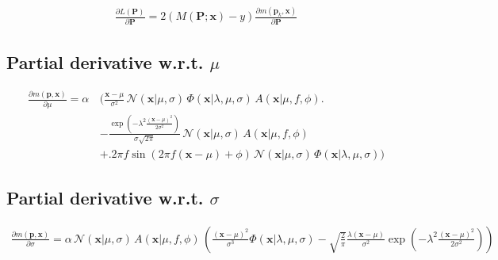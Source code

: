 \documentclass{article}
\begin{document}
\begin{align}
\frac{\partial L\left(\mathbf{P}\right)}{\partial \mathbf{P}}=2\left(M\left(\mathbf{P};\mathbf{x}\right)-y\right)\frac{\partial m\left(\mathbf{p}_k,\mathbf{x}\right)}{\partial \mathbf{P}}
\label{eq:partial_mu}
\end{align}

\subsection{Partial derivative w.r.t. $\mu$}

\begin{align}
\frac{\partial m\left(\mathbf{p},\mathbf{x}\right)}{\partial \mu} = \alpha \, 
&\Bigg(\frac{\mathbf{x}-\mu}{\sigma^2} \, \mathcal{N}(\mathbf{x}|\mu,\sigma) \, \Phi(\mathbf{x}|\lambda,\mu,\sigma) \, A(\mathbf{x}|\mu,f,\phi) \Bigg. \\
&-\frac{\exp\left(-\lambda^2\frac{(\mathbf{x}-\mu)^2}{2\sigma^2}\right)}{\sigma\sqrt{2\pi}} \, \mathcal{N}(\mathbf{x}|\mu,\sigma) \, A(\mathbf{x}|\mu,f,\phi) \\
&+\Bigg. 2\pi f \sin(2\pi f(\mathbf{x}-\mu)+\phi) \, \mathcal{N}(\mathbf{x}|\mu,\sigma) \, \Phi(\mathbf{x}|\lambda,\mu,\sigma)
\Bigg)
\end{align}

\subsection{Partial derivative w.r.t. $\sigma$}

\begin{align}
\frac{\partial m\left(\mathbf{p},\mathbf{x}\right)}{\partial \sigma} =
\alpha \, \mathcal{N}(\mathbf{x}|\mu,\sigma) \, A(\mathbf{x}|\mu,f,\phi) \, \left(
\frac{(\mathbf{x}-\mu)^2}{\sigma^3} \Phi(\mathbf{x}|\lambda,\mu,\sigma)
-\sqrt{\frac{2}{\pi}}\frac{\lambda(\mathbf{x}-\mu)}{\sigma^2}\exp\left(-\lambda^2\frac{(\mathbf{x}-\mu)^2}{2\sigma^2}\right)
\right)
\end{align}
\end{document}
